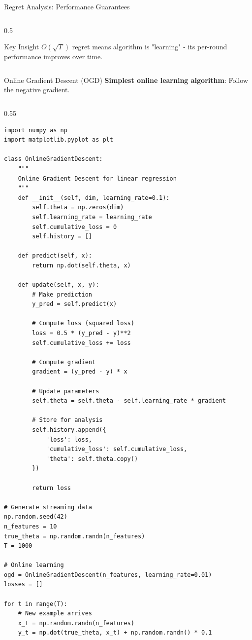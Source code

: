 \begin{frame}{Regret Analysis: Performance Guarantees}
\begin{columns}
\begin{column}{0.5\textwidth}
\begin{alertblock}{Key Insight}
$O(\sqrt{T})$ regret means algorithm is "learning" - its per-round performance improves over time.
\end{alertblock}
\end{column}
\end{columns}
\end{frame}

\begin{frame}[fragile]{Online Gradient Descent (OGD)}
\textbf{Simplest online learning algorithm}: Follow the negative gradient.

\begin{columns}
\begin{column}{0.55\textwidth}
\begin{lstlisting}[basicstyle=\ttfamily\tiny]
import numpy as np
import matplotlib.pyplot as plt

class OnlineGradientDescent:
    """
    Online Gradient Descent for linear regression
    """
    def __init__(self, dim, learning_rate=0.1):
        self.theta = np.zeros(dim)
        self.learning_rate = learning_rate
        self.cumulative_loss = 0
        self.history = []

    def predict(self, x):
        return np.dot(self.theta, x)

    def update(self, x, y):
        # Make prediction
        y_pred = self.predict(x)

        # Compute loss (squared loss)
        loss = 0.5 * (y_pred - y)**2
        self.cumulative_loss += loss

        # Compute gradient
        gradient = (y_pred - y) * x

        # Update parameters
        self.theta = self.theta - self.learning_rate * gradient

        # Store for analysis
        self.history.append({
            'loss': loss,
            'cumulative_loss': self.cumulative_loss,
            'theta': self.theta.copy()
        })

        return loss

# Generate streaming data
np.random.seed(42)
n_features = 10
true_theta = np.random.randn(n_features)
T = 1000

# Online learning
ogd = OnlineGradientDescent(n_features, learning_rate=0.01)
losses = []

for t in range(T):
    # New example arrives
    x_t = np.random.randn(n_features)
    y_t = np.dot(true_theta, x_t) + np.random.randn() * 0.1


\end{lstlisting}
\end{column}
\end{columns}
\end{frame}
